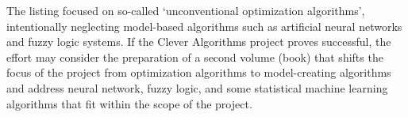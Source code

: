 \documentclass[a4paper, 11pt]{article}
\begin{document}
The listing focused on so-called `unconventional optimization algorithms', intentionally neglecting model-based algorithms such as artificial neural networks and fuzzy logic systems. If the Clever Algorithms project proves successful, the effort may consider the preparation of a second volume (book) that shifts the focus of the project from optimization algorithms to model-creating algorithms and address neural network, fuzzy logic, and some statistical machine learning algorithms that fit within the scope of the project.



\end{document}
